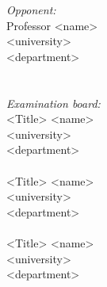 \begin{minipage}[t]{7.25cm}
\singlespacing
{\small
\textit{Opponent:}\\
Professor <name> \\
<university> \\
<department> \\
\\
\\
\textit{Examination board:}\\
<Title> <name> \\
<university> \\
<department> \\
\\
<Title> <name> \\
<university> \\
<department> \\
\\
<Title> <name> \\
<university> \\
<department> \\
}
\end{minipage}

